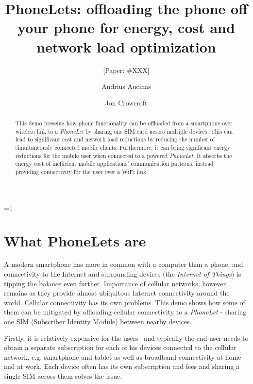 \documentclass{sig-alternate-10pt}
\def\anon{0}        %
\begin{document}
\date{}


\title{PhoneLets: offloading the phone off your phone for energy, cost and network load optimization}
\ifnum\anon=1
\author{[Paper: \#XXX]}%
\else
{}
\author{
\alignauthor Andrius Aucinas\\
\and
\alignauthor Jon Crowcroft\\
}
\fi

    
\maketitle
\begin{abstract}
This demo presents how phone functionality can be offloaded from a smartphone over wireless link to a \emph{PhoneLet} by sharing one SIM card across multiple devices. This can lead to significant cost and network load reductions by reducing the number of simultaneously connected mobile clients. Furthermore, it can bring significant energy reductions for the mobile user when connected to a powered \emph{PhoneLet}. It absorbs the energy cost of inefficient mobile applications' communication patterns, instead providing connectivity for the user over a WiFi link.
\end{abstract} 

\section{What PhoneLets are}
\label{section:intro}

A modern smartphone has more in common with a computer than a phone, and connectivity to the Internet and surrounding devices (the \emph{Internet of Things}) is tipping the balance even further. Importance of cellular networks, however, remains as they provide almost ubiquitous Internet connectivity around the world. Cellular connectivity has its own problems. This demo shows how some of them can be mitigated by offloading cellular connectivity to a \emph{PhoneLet} - sharing one SIM (Subscriber Identity Module) between nearby devices.

Firstly, it is relatively expensive for the users~\cite{Anonymous:2013ut} and typically the end user needs to obtain a separate subscription for each of his devices connected to the cellular network, e.g. smartphone and tablet as well as broadband connectivity at home and at work. Each device often has its own subscription and fees and sharing a single SIM across them solves the issue. 
\end{document}
